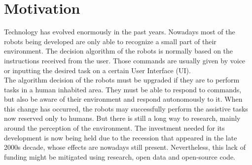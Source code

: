 
\section{Motivation}

Technology has evolved enormously in the past years. 
Nowadays most of the robots being developed are only able to recognize a small part of their environment. 
The decision algorithm of the robots is normally based on the instructions received from the user. 
Those commands are usually given by voice or inputting the desired task on a certain User Interface (UI).
\\

The algorithm decision of the robots must be upgraded if they are to perform tasks in a human inhabited area. %
They must be able to respond to commands, but also be aware of their environment and respond autonomously to it. 
When this change has occurred, the robots may successfully perform the assistive tasks now reserved only to humans. 
But there is still a long way to research, mainly around the perception of the environment. 
The investment needed for its development is now being held due to the recession that appeared in the late 2000s decade, whose effects are nowadays still present. 
Nevertheless, this lack of funding might be mitigated using research, open data and open-source code. 
\\


